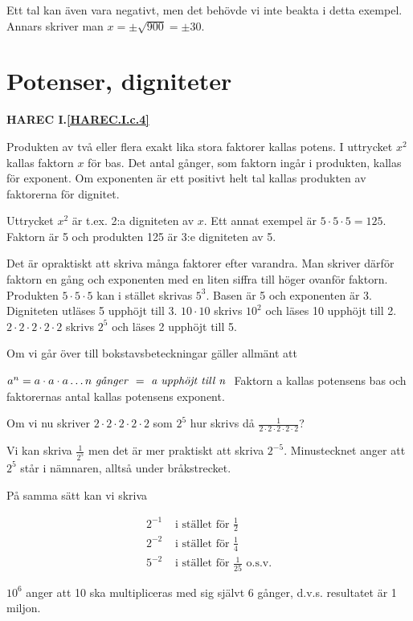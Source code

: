 Ett tal kan även vara negativt, men det behövde vi inte beakta i detta exempel.
Annars skriver man \(x = \pm \sqrt{900} = \pm 30\).

\section{Potenser, digniteter}
\textbf{HAREC I.\ref{HAREC.I.c.4}\label{myHAREC.I.c.4}}

Produkten av två eller flera exakt lika stora faktorer kallas potens. I
uttrycket \(x^2\) kallas faktorn \(x\) för bas. Det antal gånger, som faktorn ingår
i produkten, kallas för exponent. Om exponenten är ett positivt helt tal
kallas produkten av faktorerna för dignitet.

Uttrycket \(x^2\) är t.ex. 2:a digniteten av \(x\).
Ett annat exempel är \(5 \cdot 5 \cdot 5 = 125\).
Faktorn är 5 och produkten 125 är 3:e digniteten av 5.

Det är opraktiskt att skriva många faktorer efter varandra. Man skriver därför
faktorn en gång och exponenten med en liten siffra till höger ovanför faktorn.
Produkten \(5 \cdot 5 \cdot 5\) kan i stället skrivas \(5^3\).
Basen är 5 och exponenten är 3. Digniteten utläses 5 upphöjt till 3.
\(10 \cdot 10\) skrivs \(10^2\) och läses 10 upphöjt till 2.
\(2 \cdot 2 \cdot 2 \cdot 2 \cdot 2\) skrivs \(2^5\) och läses 2 upphöjt
till 5.

Om vi går över till bokstavsbeteckningar gäller allmänt att

\(a^n= a \cdot a \cdot a \ldots n \textrm{ \emph{g{\aa}nger} } = \textrm{ \emph{a
  upphöjt till n} }\) 
Faktorn a kallas potensens bas och faktorernas antal kallas potensens exponent.

Om vi nu skriver \(2 \cdot 2 \cdot 2 \cdot 2 \cdot 2\) som \(2^5\) hur skrivs då
\(\frac{1}{2 \cdot 2 \cdot 2 \cdot 2 \cdot 2}\)?

Vi kan skriva \(\frac{1}{2^5}\) men det är mer praktiskt att skriva \(2^{-5}\).
Minustecknet anger att \(2^5\) står i nämnaren, alltså under bråkstrecket.

På samma sätt kan vi skriva

\begin{align*}
2^{-1} & \text{ i stället för } \frac{1}{2} \\
2^{-2} & \text{ i stället för } \frac{1}{4} \\
5^{-2} & \text{ i stället för } \frac{1}{25} \text{ o.s.v.}
\end{align*}


\(10^6\) anger att 10 ska multipliceras med sig självt 6 gånger, d.v.s.
resultatet är 1 miljon.

